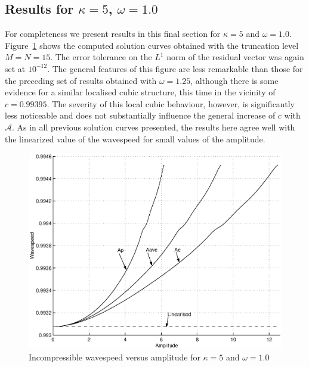 \subsection[Results for $\kappa=5$, $\omega=1.0$]{Results for \boldmath$\kappa=5$, $\omega=1.0$}
\label{subsec:incomnlk5w1}
For completeness we present results in this final section for $\kappa=5$ and $\omega=1.0$. Figure~\ref{fig:CvsAk5w1} shows the computed solution curves obtained with the truncation level $M=N=15$. The error tolerance on the $L^1$ norm of the residual vector was again set at $10^{-12}$. The general features of this figure are less remarkable than those for the preceding set of results obtained with $\omega=1.25$, although there is some evidence for a similar localised cubic structure, this time in the vicinity of $c=0.99395$. The severity of this local cubic behaviour, however, is significantly less noticeable and does not substantially influence the general increase of $c$ with $\mathcal{A}$. As in all previous solution curves presented, the results here agree well with the linearized value of the wavespeed for small values of the amplitude.
\begin{figure}[htbp]
	\centering
		\includegraphics[scale=0.75]{IMAGES/CvsAk5w1.eps}
	\caption{Incompressible wavespeed versus amplitude for $\kappa=5$ and $\omega=1.0$}
	\label{fig:CvsAk5w1}
\end{figure}

